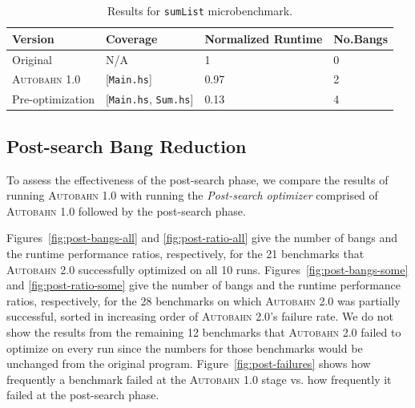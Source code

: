 \documentclass[format=sigplan, review=true, 9pt]{acmart}
\newcommand{\cut}[1]{}
\newcommand{\figref}[1]{Figure~\ref{#1}}
\newcommand{\hotspotcost}[0]{\textit{hotSpotThreshold}}
\newcommand{\Ao}[0]{\textsc{Autobahn 1.0}}
\newcommand{\At}[0]{\textsc{Autobahn 2.0}}
\newcommand{\postopt}[0]{post-search}
\newcommand{\Postopt}[0]{Post-search}
\newcommand{\absim}[0]{\textit{absenceImpact}}
\begin{document}
\begin{table}
\begin{tabular}{p{2.5cm}p{1.5cm}p{2cm}p{1cm}}
\hline
Version   & Coverage & Normalized Runtime & No.Bangs \\
\hline
Original      & N/A   &   1	 & 0   \\
\Ao{}       & [\texttt{Main.hs}]      & 0.97    &  2\\
Pre-optimization	& [\texttt{Main.hs}, \texttt{Sum.hs}]         & 0.13      & 4\\
\hline
\end{tabular}
\caption{Results for \texttt{sumList} microbenchmark.}
\label{table:sumList}
\end{table}

\subsection{\Postopt{} Bang Reduction}

To assess the effectiveness of the \postopt{} phase,
we compare the results of running \Ao{} with running 
the \textit{\Postopt{} optimizer} comprised of \Ao{} followed by
the \postopt{} phase.
\cut{
Already discussed and so not necessary:
Similarly, we took the mean of running the
program ten times on the NoFib benchmark suite while optimizing on
runtime only, and set both \hotspotcost{} and \absim{} thresholds to
6\%.
A benchmark is successfully optimized if \Ao{} improved its
performance by at least 6\% after optimization. }
Figures~\ref{fig:post-bangs-all} and \ref{fig:post-ratio-all}
give the number of bangs and the runtime performance ratios,
respectively, for the 21 benchmarks that \At{} successfully optimized on all 10 runs. 
Figures~\ref{fig:post-bangs-some} and \ref{fig:post-ratio-some}
give the number of bangs and the runtime performance ratios, respectively,
for the 28 benchmarks on which \At{} was partially successful,
sorted in increasing order of \At{}'s failure rate.
We do not show the results from the remaining 12 benchmarks that \At{}
failed to optimize on every run since the numbers for those benchmarks
would be unchanged from the original program.  \figref{fig:post-failures} shows how
frequently a benchmark failed at the \Ao{} stage vs. how frequently it
failed at the \postopt{} phase.
\end{document}

